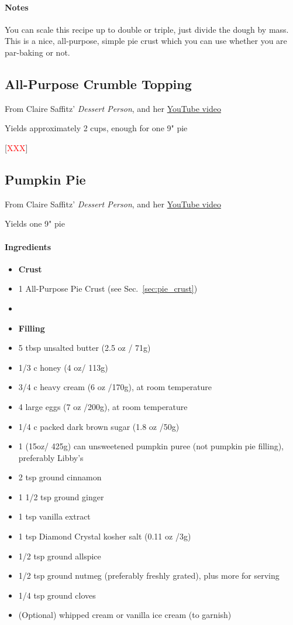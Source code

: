 \documentclass[12pt]{article}
\newcommand{\TODO}{[\textcolor{red}{XXX}]}
\newenvironment*{ingredients}
	{
		\paragraph*{Ingredients}
		\begin{itemize}
	}
	{
		\end{itemize}
	}
\newenvironment*{notes}
	{
		\paragraph*{Notes}
		\begin{adjustwidth}{1cm}{}
	}
	{
		\end{adjustwidth}
	}
\begin{document}
	\begin{notes}
		You can scale this recipe up to double or triple, just divide the dough by mass. This is a nice, all-purpose, simple pie crust which you can use whether you are par-baking or not.
	\end{notes}
	
	\newpage
	
	\subsection{All-Purpose Crumble Topping}\label{sec:crumble_topping}
	From Claire Saffitz' \textit{Dessert Person}, and her \href{https://www.youtube.com/watch?v=7PHSWxGLSEE}{YouTube video}
	
	Yields approximately 2 cups, enough for one 9" pie
	
	\TODO
	
	\newpage
	
	\subsection{Pumpkin Pie}
	From Claire Saffitz' \textit{Dessert Person}, and her \href{https://www.youtube.com/watch?v=vT4Kk9v3B5Y}{YouTube video}
	
	Yields one 9" pie
	
	\begin{ingredients}
		\item[] \textbf{Crust}
		\item 1 All-Purpose Pie Crust (see Sec.~\ref{sec:pie_crust})
		\item[] \hfill
		\item[] \textbf{Filling}
		\item 5 tbsp unsalted butter (2.5 oz / 71g) 
		\item 1/3 c honey (4 oz/ 113g)
		\item 3/4 c heavy cream (6 oz /170g), at room temperature
		\item 4 large eggs (7 oz /200g), at room temperature
		\item 1/4 c packed dark brown sugar (1.8 oz /50g)
		\item 1 (15oz/ 425g) can unsweetened pumpkin puree (not pumpkin pie filling), preferably Libby's
		\item 2 tsp ground cinnamon
		\item 1 1/2 tsp ground ginger
		\item 1 tsp vanilla extract
		\item 1 tsp Diamond Crystal kosher salt (0.11 oz /3g)
		\item 1/2 tsp ground allspice
		\item 1/2 tsp ground nutmeg (preferably freshly grated), plus more for serving
		\item 1/4 tsp ground cloves
		\item (Optional) whipped cream or vanilla ice cream (to garnish)
	\end{ingredients}
	
\end{document}

